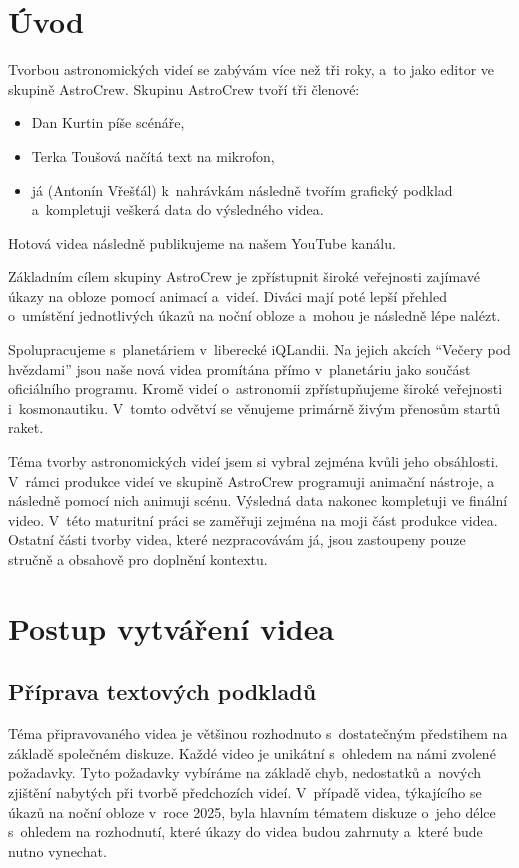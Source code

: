 \documentclass[12pt,a4paper,titlepage]{article}
\begin{document}
\section{Úvod}
Tvorbou astronomických videí se zabývám více než tři roky, a~to jako editor ve skupině AstroCrew. Skupinu AstroCrew tvoří tři členové:

\begin{itemize}
	\item Dan Kurtin píše scénáře,
	\item Terka Toušová načítá text na mikrofon,
	\item já (Antonín Vřešťál) k~nahrávkám následně tvořím grafický podklad a~kompletuji veškerá data do výsledného videa.
\end{itemize}
Hotová videa následně publikujeme na našem YouTube kanálu. 

Základním cílem skupiny AstroCrew je zpřístupnit široké veřejnosti zajímavé úkazy na obloze pomocí animací a~videí. Diváci mají poté lepší přehled o~umístění jednotlivých úkazů na noční obloze a~mohou je následně lépe nalézt.

Spolupracujeme s~planetáriem v~liberecké iQLandii. Na jejich akcích \enquote{Večery pod hvězdami} jsou naše nová videa promítána přímo v~planetáriu jako součást oficiálního programu. Kromě videí o~astronomii zpřístupňujeme široké veřejnosti i~kosmonautiku. V~tomto odvětví se věnujeme primárně živým přenosům startů raket.

Téma tvorby astronomických videí jsem si vybral zejména kvůli jeho obsáhlosti. V~rámci produkce videí ve skupině AstroCrew programuji animační nástroje, a následně pomocí nich animuji scénu. Výsledná data nakonec kompletuji ve finální video. V~této maturitní práci se zaměřuji zejména na moji část produkce videa. Ostatní části tvorby videa, které nezpracovávám já, jsou zastoupeny pouze stručně a obsahově pro doplnění kontextu. 
\section{Postup vytváření videa}\label{makingof}
\subsection{Příprava textových podkladů}\label{makingof:text-prep}
Téma připravovaného videa je většinou rozhodnuto s~dostatečným předstihem na základě společném diskuze. Každé video je unikátní s~ohledem na námi zvolené požadavky. Tyto požadavky vybíráme na základě chyb, nedostatků a~nových zjištění nabytých při tvorbě předchozích videí. V~případě videa, týkajícího se úkazů na noční obloze v~roce 2025, byla hlavním tématem diskuze o~jeho délce s~ohledem na rozhodnutí, které úkazy do videa budou zahrnuty a~které bude nutno vynechat.
\end{document}
